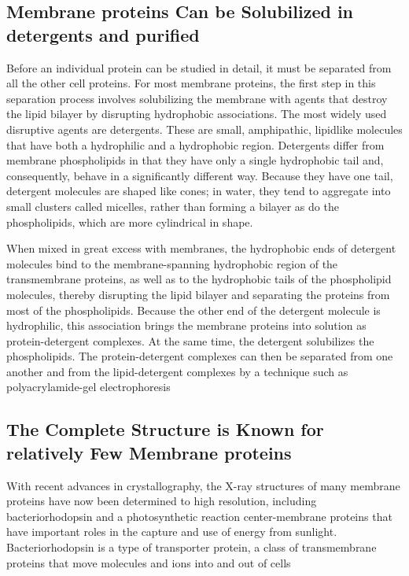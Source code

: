 \subsection{Membrane proteins Can be Solubilized in detergents and purified}

Before an individual protein can be studied in detail, it must be separated
from all the other cell proteins. For most membrane proteins, the first step
in this separation process involves solubilizing the membrane with agents
that destroy the lipid bilayer by disrupting hydrophobic associations. The
most widely used disruptive agents are detergents. These
are small, amphipathic, lipidlike molecules that have both a hydrophilic
and a hydrophobic region. Detergents differ from membrane
phospholipids in that they have only a single hydrophobic tail and,
consequently, behave in a significantly different way. Because they have
one tail, detergent molecules are shaped like cones; in water, they tend to
aggregate into small clusters called micelles, rather than forming a bilayer
as do the phospholipids, which are more cylindrical in shape.

When mixed in great excess with membranes, the hydrophobic ends of
detergent molecules bind to the membrane-spanning hydrophobic region
of the transmembrane proteins, as well as to the hydrophobic tails of the
phospholipid molecules, thereby disrupting the lipid bilayer and separating
the proteins from most of the phospholipids. Because the other
end of the detergent molecule is hydrophilic, this association brings the
membrane proteins into solution as protein-detergent complexes.
At the same time, the detergent solubilizes the phospholipids. The
protein-detergent complexes can then be separated from one another
and from the lipid-detergent complexes by a technique such as polyacrylamide-gel
electrophoresis

\subsection{The Complete Structure is Known for relatively Few Membrane proteins}

With recent advances in crystallography, the X-ray structures of many membrane
proteins have now been determined to high resolution, including
bacteriorhodopsin and a photosynthetic reaction center-membrane proteins
that have important roles in the capture and use of energy from sunlight.
Bacteriorhodopsin is a type of transporter protein, a class of
transmembrane proteins that move molecules and ions into and out of
cells

